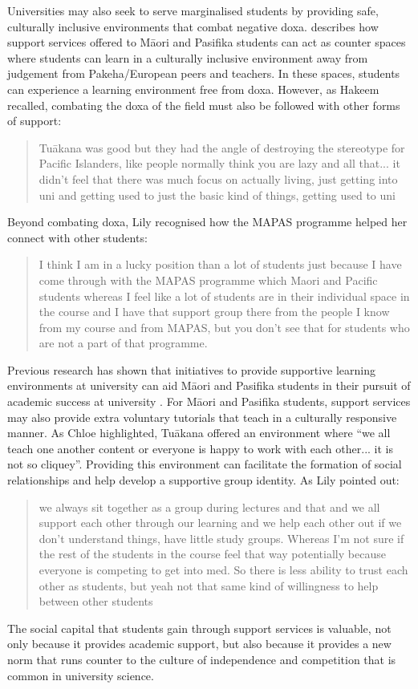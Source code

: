 Universities may also seek to serve marginalised students by providing safe, culturally inclusive environments that combat negative doxa. \cite{mayeda2014you} describes how support services offered to M\={a}ori and Pasifika students can act as counter spaces where students can learn in a culturally inclusive environment away from judgement from Pakeha/European peers and teachers. In these spaces, students can experience a learning environment free from doxa. However, as Hakeem recalled, combating the doxa of the field must also be followed with other forms of support: \blockquote{Tu\={a}kana was good but they had the angle of destroying the stereotype for Pacific Islanders, like people normally think you are lazy and all that... it didn't feel that there was much focus on actually living, just getting into uni and getting used to just the basic kind of things, getting used to uni} Beyond combating doxa, Lily recognised how the MAPAS programme helped her connect with other students: \blockquote{I think I am in a lucky position than a lot of students just because I have come through with the MAPAS programme which Maori and Pacific students whereas I feel like a lot of students are in their individual space in the course and I have that support group there from the people I know from my course and from MAPAS, but you don’t see that for students who are not a part of that programme.} Previous research has shown that initiatives to provide supportive learning environments at university can aid M\={a}ori and Pasifika students in their pursuit of academic success at university \cite{wilson2011awhina}. For M\={a}ori and Pasifika students, support services may also provide extra voluntary tutorials that teach in a culturally responsive manner. As Chloe highlighted, Tu\={a}kana offered an environment where ``we all teach one another content or everyone is happy to work with each other...  it is not so cliquey''. Providing this environment can facilitate the formation of social relationships and help develop a supportive group identity. As Lily pointed out: \blockquote{we always sit together as a group during lectures and that and we all support each other through our learning and we help each other out if we don’t understand things, have little study groups. Whereas I’m not sure if the rest of the students in the course feel that way potentially because everyone is competing to get into med. So there is less ability to trust each other as students, but yeah not that same kind of willingness to help between other students}. The social capital that students gain through support services is valuable, not only because it provides academic support, but also because it provides a new norm that runs counter to the culture of independence and competition that is common in university science.

